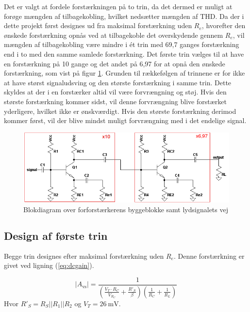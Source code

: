 Det er valgt at fordele forstærkningen på to trin, da det dermed er muligt at forøge mængden af tilbagekobling, hvilket nedsætter mængden af THD. Da der i dette projekt først designes ud fra maksimal forstærkning uden $R_e$, hvorefter den ønskede forstærkning opnås ved at tilbagekoble det overskydende gennem $R_e$, vil mængden af tilbagekobling være mindre i ét trin med 69,7 ganges forstærkning end i to med den samme samlede forstærkning.
Det første trin vælges til at have en forstærkning på 10 gange og det andet på 6,97 for at opnå den ønskede forstærkning, som vist på figur \ref{blok_forforstaerker}. Grunden til rækkefølgen af trinnene er for ikke at have størst signaludsving og den største forstærkning i samme trin. Dette skyldes at der i en forstærker altid vil være forvrængning og støj. Hvis den største forstærkning kommer sidst, vil denne forvrængning blive forstærket yderligere, hvilket ikke er ønskværdigt. Hvis den største forstærkning derimod kommer først, vil der blive mindst muligt forvrængning med i det endelige signal.

\begin{figure}[h]
\centering
\includegraphics[scale=.6]{teknisk/forforstaerker/blok_forforstaerker.png}
\caption{Blokdiagram over forforstærkerens byggeblokke samt lydsignalets vej}
\label{blok_forforstaerker}
\end{figure}



\subsection*{Design af første trin}
Begge trin designes efter maksimal forstærkning uden $R_e$. Denne forstærkning er givet ved ligning (\ref{eq:dcgain}).

\begin{equation}
|A_{\mathrm{vs}}|=\frac{1}{\left(\frac{V_T \cdot R_C}{V_{R_C}}+\frac{R'_S}{\beta}\right) \left(\frac{1}{R_C}+\frac{1}{R_L}\right)}
\label{eq:dcgain}
\end{equation}
Hvor $R'_S = R_S||R_1||R_2$ og $V_T = 26~\mathrm{mV}$.

